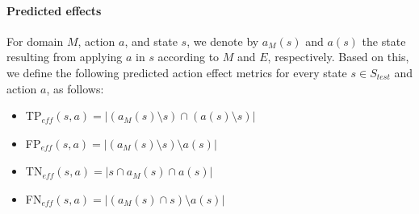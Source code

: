 \documentclass[letterpaper]{article} %
\newcommand{\eff}{\ensuremath{\textit{eff}}\xspace}
\newcommand{\stest}{\ensuremath{S_{\textit{test}}}\xspace}
\begin{document}
\paragraph{Predicted effects}
For domain $M$, action $a$, and state $s$, we denote by $a_M(s)$ and $a(s)$ the state resulting from applying $a$ in $s$ according to $M$ and $E$, respectively. 
Based on this, we define the following predicted action effect metrics for every state $s\in\stest$ and action $a$, as follows: 
\begin{itemize}
    \item TP$_{\eff}(s,a)=|(a_M(s)\setminus s)\cap (a(s)\setminus s)|$
    \item FP$_{\eff}(s,a)=|(a_M(s)\setminus s)\setminus a(s)|$ 
    \item TN$_{\eff}(s,a)=|s \cap a_M(s) \cap a(s)|$
    \item FN$_{\eff}(s,a)=|(a_M(s)\cap s)\setminus a(s)|$ 
\end{itemize}
\end{document}
